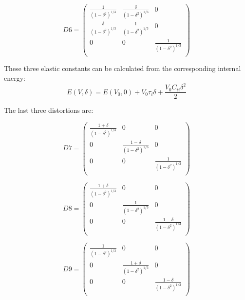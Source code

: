 \begin{equation}
						D6 = \left ( \begin{array}{ccc}
						\frac{1}{(1-\delta^2)^{1/3}} & \frac{\delta}{(1-\delta^2)^{1/3}} & 0 \\
						\frac{\delta}{(1-\delta^2)^{1/3}} & \frac{1}{(1-\delta^2)^{1/3}} & 0 \\
						0 & 0 & \frac{1}{(1-\delta^2)^{1/3}} \\
						\end{array}\right ) 
\end{equation}	


These three elastic constants can be calculated from the corresponding internal energy:
\begin{equation}
							E(V,\delta) = E(V_0,0) + V_0\tau_i \delta + \frac{V_0C_{ii}\delta^2}{2}
\end{equation}

The last three distortions are:

\begin{equation}
						D7 = \left ( \begin{array}{ccc}
						\frac{1+\delta}{(1-\delta^2)^{1/3}} & 0 & 0 \\
						0 & \frac{1-\delta}{(1-\delta^2)^{1/3}} & 0 \\
						0 & 0 & \frac{1}{(1-\delta^2)^{1/3}} \\	
						\end{array}\right ) 
\end{equation}			

\begin{equation}
						D8 = \left ( \begin{array}{ccc}
						\frac{1+\delta}{(1-\delta^2)^{1/3}} & 0 & 0 \\
						0 & \frac{1}{(1-\delta^2)^{1/3}} & 0 \\
						0 & 0 & \frac{1-\delta}{(1-\delta^2)^{1/3}} \\
						\end{array}\right ) 
\end{equation}	

\begin{equation}
						D9 = \left ( \begin{array}{ccc}
						\frac{1}{(1-\delta^2)^{1/3}} & 0 & 0 \\
						0 & \frac{1+\delta}{(1-\delta^2)^{1/3}} & 0 \\
						0 & 0 & \frac{1-\delta}{(1-\delta^2)^{1/3}} \\	
						\end{array}\right ) 
\end{equation}


